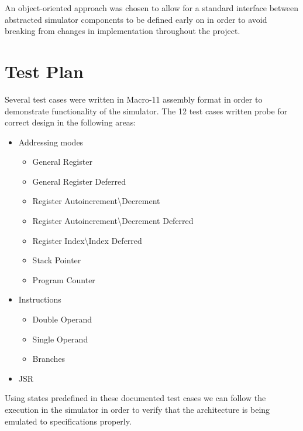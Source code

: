 \documentclass[]{report}   %
\begin{document}
An object-oriented approach was chosen to allow for a standard interface between abstracted simulator components to be defined early on in order to avoid breaking from changes in implementation throughout the project.

\chapter{Test Plan}
Several test cases were written in Macro-11 assembly format in order to demonstrate functionality of the simulator. The 12 test cases written probe for correct design in the following areas:

\begin{itemize}
  \item Addressing modes
  \begin{itemize}
  \item General Register
  \item General Register Deferred
  \item Register Autoincrement\textbackslash Decrement
  \item Register Autoincrement\textbackslash Decrement Deferred
  \item Register Index\textbackslash Index Deferred
  \item Stack Pointer
  \item Program Counter
  \end{itemize}
\item Instructions
  \begin{itemize}
  \item Double Operand
  \item Single Operand
  \item Branches
  \end{itemize}
\item JSR
\end{itemize}

Using states predefined in these documented test cases we can follow the execution in the simulator in order to verify that the architecture is being emulated to specifications properly.

\end{document}
